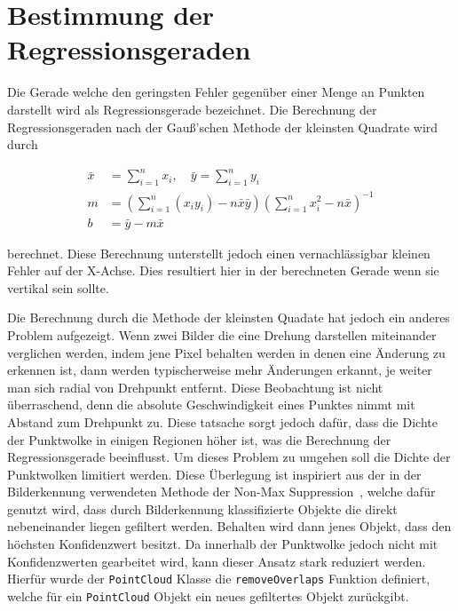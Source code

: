 \section{Bestimmung der Regressionsgeraden}\label{ch:bestimmung_regressionsgerade}

Die Gerade welche den geringsten Fehler gegenüber einer Menge an Punkten darstellt wird als Regressionsgerade bezeichnet.
Die Berechnung der Regressionsgeraden nach der Gau{\ss}'schen Methode der kleinsten Quadrate wird durch %

\begin{equation}
    \begin{split}
        \bar{x} &= \sum_{i=1}^n x_i, \quad \bar{y} = \sum_{i=1}^n y_i \\
        m &= \left(\sum_{i=1}^n (x_i y_i) - n \bar{x} \bar{y}\right) \left(\sum_{i=1}^n x_i^2 - n \bar{x}\right)^{-1} \\
        b &= \bar{y} - m\bar{x}
    \end{split}
    \label{eq:regression_gauss}
\end{equation}

berechnet.
Diese Berechnung unterstellt jedoch einen vernachlässigbar kleinen Fehler auf der X-Achse.
Dies resultiert hier in der berechneten Gerade wenn sie vertikal sein sollte.

Die Berechnung durch die Methode der kleinsten Quadate hat jedoch ein anderes Problem aufgezeigt.
Wenn zwei Bilder die eine Drehung darstellen miteinander verglichen werden, indem jene Pixel behalten werden in denen eine Änderung zu erkennen ist, dann werden typischerweise mehr Änderungen erkannt, je weiter man sich radial von Drehpunkt entfernt.
Diese Beobachtung ist nicht überraschend, denn die absolute Geschwindigkeit eines Punktes nimmt mit Abstand zum Drehpunkt zu.
Diese tatsache sorgt jedoch dafür, dass die Dichte der Punktwolke in einigen Regionen höher ist, was die Berechnung der Regressionsgerade beeinflusst.
Um dieses Problem zu umgehen soll die Dichte der Punktwolken limitiert werden.
Diese Überlegung ist inspiriert aus der in der Bilderkennung verwendeten Methode der Non-Max Suppression~\cite{Geron2019}, welche dafür genutzt wird, dass durch Bilderkennung klassifizierte Objekte die direkt nebeneinander liegen gefiltert werden.
Behalten wird dann jenes Objekt, dass den höchsten Konfidenzwert besitzt.
Da innerhalb der Punktwolke jedoch nicht mit Konfidenzwerten gearbeitet wird, kann dieser Ansatz stark reduziert werden.
Hierfür wurde der \lstinline{PointCloud} Klasse die \lstinline{removeOverlaps} Funktion definiert, welche für ein \lstinline{PointCloud} Objekt ein neues gefiltertes Objekt zurückgibt.

